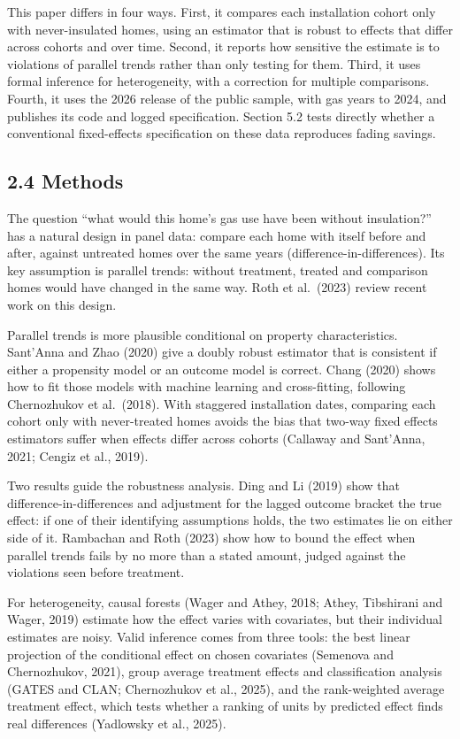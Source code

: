 \documentclass[11pt,a4paper]{article}
\begin{document}
This paper differs in four ways. First, it compares each installation cohort only with never-insulated homes, using an estimator that is robust to effects that differ across cohorts and over time. Second, it reports how sensitive the estimate is to violations of parallel trends rather than only testing for them. Third, it uses formal inference for heterogeneity, with a correction for multiple comparisons. Fourth, it uses the 2026 release of the public sample, with gas years to 2024, and publishes its code and logged specification. Section 5.2 tests directly whether a conventional fixed-effects specification on these data reproduces fading savings.

\subsection*{2.4 Methods}

The question ``what would this home's gas use have been without insulation?'' has a natural design in panel data: compare each home with itself before and after, against untreated homes over the same years (difference-in-differences). Its key assumption is parallel trends: without treatment, treated and comparison homes would have changed in the same way. Roth et al.~(2023) review recent work on this design.

Parallel trends is more plausible conditional on property characteristics. Sant'Anna and Zhao (2020) give a doubly robust estimator that is consistent if either a propensity model or an outcome model is correct. Chang (2020) shows how to fit those models with machine learning and cross-fitting, following Chernozhukov et al.~(2018). With staggered installation dates, comparing each cohort only with never-treated homes avoids the bias that two-way fixed effects estimators suffer when effects differ across cohorts (Callaway and Sant'Anna, 2021; Cengiz et al., 2019).

Two results guide the robustness analysis. Ding and Li (2019) show that difference-in-differences and adjustment for the lagged outcome bracket the true effect: if one of their identifying assumptions holds, the two estimates lie on either side of it. Rambachan and Roth (2023) show how to bound the effect when parallel trends fails by no more than a stated amount, judged against the violations seen before treatment.

For heterogeneity, causal forests (Wager and Athey, 2018; Athey, Tibshirani and Wager, 2019) estimate how the effect varies with covariates, but their individual estimates are noisy. Valid inference comes from three tools: the best linear projection of the conditional effect on chosen covariates (Semenova and Chernozhukov, 2021), group average treatment effects and classification analysis (GATES and CLAN; Chernozhukov et al., 2025), and the rank-weighted average treatment effect, which tests whether a ranking of units by predicted effect finds real differences (Yadlowsky et al., 2025).
\end{document}
